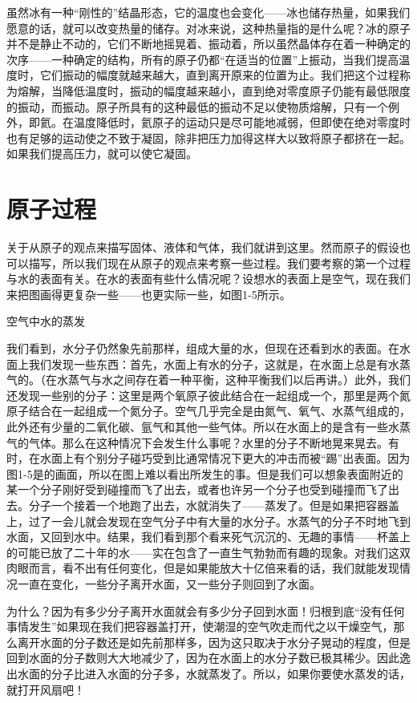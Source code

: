 \documentclass[12pt,oneside]{book}
\begin{document}
虽然冰有一种“刚性的”结晶形态，它的温度也会变化——冰也储存热量，如果我们愿意的话，就可以改变热量的储存。对冰来说，这种热量指的是什么呢？冰的原子并不是静止不动的，它们不断地摇晃着、振动着，所以虽然晶体存在着一种确定的次序——一种确定的结构，所有的原子仍都“在适当的位置”上振动，当我们提高温度时，它们振动的幅度就越来越大，直到离开原来的位置为止。我们把这个过程称为熔解，当降低温度时，振动的幅度越来越小，直到绝对零度原子仍能有最低限度的振动，而振动。原子所具有的这种最低的振动不足以使物质熔解，只有一个例外，即氦。在温度降低时，氦原子的运动只是尽可能地减弱，但即使在绝对零度时也有足够的运动使之不致于凝固，除非把压力加得这样大以致将原子都挤在一起。如果我们提高压力，就可以使它凝固。


\section{原子过程}
关于从原子的观点来描写固体、液体和气体，我们就讲到这里。然而原子的假设也可以描写，所以我们现在从原子的观点来考察一些过程。我们要考察的第一个过程与水的表面有关。在水的表面有些什么情况呢？设想水的表面上是空气，现在我们来把图画得更复杂一些——也更实际一些，如图1-5所示。
\begin{fig}{空气中水的蒸发}
\caption{空气中水的蒸发}
\label{fig:空气中水的蒸发}
\end{fig}
我们看到，水分子仍然象先前那样，组成大量的水，但现在还看到水的表面。在水面上我们发现一些东西：首先，水面上有水的分子，这就是，在水面上总是有水蒸气的。（在水蒸气与水之间存在着一种平衡，这种平衡我们以后再讲。）此外，我们还发现一些别的分子：这里是两个氧原子彼此结合在一起组成一个，那里是两个氮原子结合在一起组成一个氮分子。空气几乎完全是由氮气、氧气、水蒸气组成的，此外还有少量的二氧化碳、氩气和其他一些气体。所以在水面上的是含有一些水蒸气的气体。那么在这种情况下会发生什么事呢？水里的分子不断地晃来晃去。有时，在水面上有个别分子碰巧受到比通常情况下更大的冲击而被“踢”出表面。因为图1-5是的画面，所以在图上难以看出所发生的事。但是我们可以想象表面附近的某一个分子刚好受到碰撞而飞了出去，或者也许另一个分子也受到碰撞而飞了出去。分子一个接着一个地跑了出去，水就消失了——蒸发了。但是如果把容器盖上，过了一会儿就会发现在空气分子中有大量的水分子。水蒸气的分子不时地飞到水面，又回到水中。结果，我们看到那个看来死气沉沉的、无趣的事情——杯盖上的可能已放了二十年的水——实在包含了一直生气勃勃而有趣的现象。对我们这双肉眼而言，看不出有任何变化，但是如果能放大十亿倍来看的话，我们就能发现情况一直在变化，一些分子离开水面，又一些分子则回到了水面。

为什么？因为有多少分子离开水面就会有多少分子回到水面！归根到底“没有任何事情发生”如果现在我们把容器盖打开，使潮湿的空气吹走而代之以干燥空气，那么离开水面的分子数还是如先前那样多，因为这只取决于水分子晃动的程度，但是回到水面的分子数则大大地减少了，因为在水面上的水分子数已极其稀少。因此逸出水面的分子比进入水面的分子多，水就蒸发了。所以，如果你要使水蒸发的话，就打开风扇吧！
\end{document}
